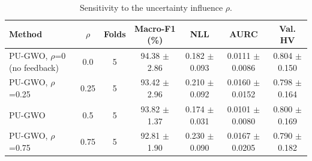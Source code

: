 \begin{table}[t]
\centering
\caption{Sensitivity to the uncertainty influence $\rho$.}
\label{tab:table7b_rho_sensitivity}
\small
\begin{tabular}{lcccccc}
\toprule
Method & $\rho$ & Folds & Macro-F1 (\%) & NLL & AURC & Val. HV \\
\midrule
PU-GWO, $\rho$=0 (no feedback) & 0.0 & 5 & 94.38 $\pm$ 2.86 & 0.182 $\pm$ 0.093 & 0.0111 $\pm$ 0.0086 & 0.804 $\pm$ 0.150 \\
PU-GWO, $\rho$=0.25 & 0.25 & 5 & 93.42 $\pm$ 2.96 & 0.210 $\pm$ 0.092 & 0.0160 $\pm$ 0.0152 & 0.798 $\pm$ 0.164 \\
PU-GWO & 0.5 & 5 & 93.82 $\pm$ 1.37 & 0.174 $\pm$ 0.031 & 0.0101 $\pm$ 0.0080 & 0.800 $\pm$ 0.169 \\
PU-GWO, $\rho$=0.75 & 0.75 & 5 & 92.81 $\pm$ 1.90 & 0.230 $\pm$ 0.090 & 0.0167 $\pm$ 0.0205 & 0.790 $\pm$ 0.182 \\
\bottomrule
\end{tabular}
\end{table}

